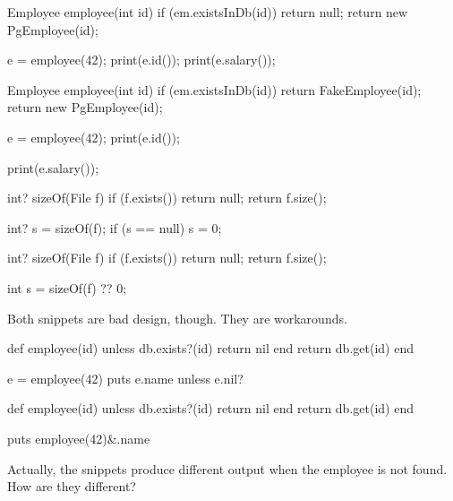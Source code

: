 \documentclass{article}
\begin{document}

\begin{pptWide}{2}
{\small\begin{ffcode}
Employee employee(int id) {
  if (em.existsInDb(id)) {
    return null;
  }
  return new PgEmployee(id);
}

e = employee(42);
print(e.id());
print(e.salary());
\end{ffcode}
}
\par\columnbreak\par
{\small\begin{ffcode}
Employee employee(int id) {
  if (em.existsInDb(id)) {
    return FakeEmployee(id);
  }
  return new PgEmployee(id);
}

e = employee(42);
print(e.id());

print(e.salary());
\end{ffcode}
}
\end{pptWide}
\par
\plush{}


\begin{pptWide}{2}
{\small\begin{ffcode}
int? sizeOf(File f) {
  if (f.exists()) {
    return null;
  }
  return f.size();
}

int? s = sizeOf(f);
if (s == null) {
  s = 0;
}
\end{ffcode}
}
\par\columnbreak\par
{\small\begin{ffcode}
int? sizeOf(File f) {
  if (f.exists()) {
    return null;
  }
  return f.size();
}

int s = sizeOf(f) ?? 0;
\end{ffcode}
}
\end{pptWide}
\par
Both snippets are bad design, though. They are workarounds.
\plush{}

\begin{pptWide}{2}
{\small\begin{ffcode}
def employee(id)
  unless db.exists?(id)
    return nil
  end
  return db.get(id)
end

e = employee(42)
puts e.name unless e.nil?
\end{ffcode}
}
\par\columnbreak\par
{\small\begin{ffcode}
def employee(id)
  unless db.exists?(id)
    return nil
  end
  return db.get(id)
end

puts employee(42)&.name
\end{ffcode}
}
\end{pptWide}
\par
Actually, the snippets produce different output when the employee is not found. How are they different?
\plush{}
\end{document}
